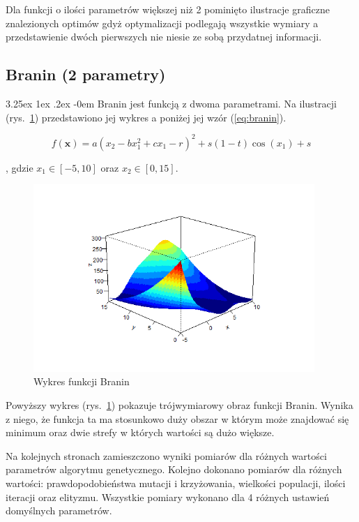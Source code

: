 \documentclass[11pt, a4paper]{article}
\makeatletter
\newcommand{\fbi}{\leavevmode{\parindent=1em\indent}}
\renewcommand\paragraph{\@startsection{paragraph}{5}{\z@}
  {3.25ex \@plus1ex \@minus.2ex}
  {-0em}
  {\normalfont\normalsize\bfseries}}
\makeatother
\begin{document}
\fbi
Dla funkcji o ilości parametrów większej niż 2 pominięto ilustracje graficzne znalezionych optimów gdyż optymalizacji podlegają wszystkie wymiary a przedstawienie dwóch pierwszych nie niesie ze sobą przydatnej informacji.

\newpage
\subsection{Branin (2 parametry)}
\paragraph{}
Branin jest funkcją z dwoma parametrami. Na ilustracji (rys.~\ref{fig:branin1}) przedstawiono jej wykres a poniżej jej wzór (\ref{eq:branin}).

\begin{equation}\label{eq:branin}
	f(\boldsymbol{x}) = a(x_2 - bx_1^2 + cx_1 - r)^2 + s(1 - t)\cos(x_1) + s
\end{equation}

, gdzie $ x_1 \in [-5, 10] $ oraz $ x_2 \in [0, 15] $.

\begin{figure}[H]
	\centering
	\includegraphics[width=0.95\textwidth]{./assets/Branin1.png}
	\caption{Wykres funkcji Branin}
	\label{fig:branin1}
\end{figure}

\fbi
Powyższy wykres (rys.~\ref{fig:branin1}) pokazuje trójwymiarowy obraz funkcji Branin. Wynika z niego, że funkcja ta ma stosunkowo duży obszar w którym może znajdować się minimum oraz dwie strefy w których wartości są dużo większe.

\fbi
Na kolejnych stronach zamieszczono wyniki pomiarów dla różnych wartości parametrów algorytmu genetycznego. Kolejno dokonano pomiarów dla różnych wartości: prawdopodobieństwa mutacji i krzyżowania, wielkości populacji, ilości iteracji oraz elityzmu. Wszystkie pomiary wykonano dla 4 różnych ustawień domyślnych parametrów.
\end{document}
